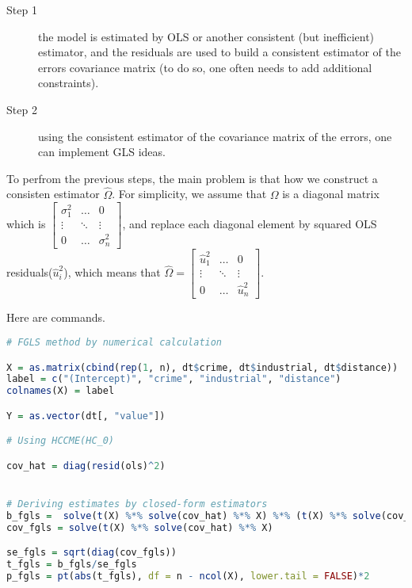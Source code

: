 \documentclass{article}
\theoremstyle{definition}
\begin{document}
\begin{description}
\item[Step 1] the model is estimated by OLS or another consistent (but inefficient) estimator, and the residuals are used to build a consistent estimator of the errors covariance matrix (to do so, one often needs to add additional constraints).
\item[Step 2] using the consistent estimator of the covariance matrix of the errors, one can implement GLS ideas.
\end{description} 

To perfrom the previous steps, the main problem is that how we construct a consisten estimator $\widehat{\Omega}$. For simplicity, we assume that $\Omega$ is a diagonal matrix which is $\begin{bmatrix}
\sigma_1^2 & \dots  & 0 \\
\vdots	   & \ddots & \vdots \\
0	       & \dots  & \sigma_n^2
\end{bmatrix}$, and replace each diagonal element by squared OLS residuals($\hat{u}_i^2$), which means that $\widehat{\Omega} = \begin{bmatrix}
\hat{u}_1^2 & \dots  & 0 \\
\vdots	   & \ddots & \vdots \\
0	       & \dots  & \hat{u}_n^2
\end{bmatrix}$.


Here are commands.\\

\begin{lstlisting}[language = R]
# FGLS method by numerical calculation

X = as.matrix(cbind(rep(1, n), dt$crime, dt$industrial, dt$distance))
label = c("(Intercept)", "crime", "industrial", "distance")
colnames(X) = label

Y = as.vector(dt[, "value"])

# Using HCCME(HC_0)

cov_hat = diag(resid(ols)^2)


# Deriving estimates by closed-form estimators 
b_fgls =  solve(t(X) %*% solve(cov_hat) %*% X) %*% (t(X) %*% solve(cov_hat) %*% Y)
cov_fgls = solve(t(X) %*% solve(cov_hat) %*% X)

se_fgls = sqrt(diag(cov_fgls))
t_fgls = b_fgls/se_fgls
p_fgls = pt(abs(t_fgls), df = n - ncol(X), lower.tail = FALSE)*2

\end{lstlisting}
\end{document}
